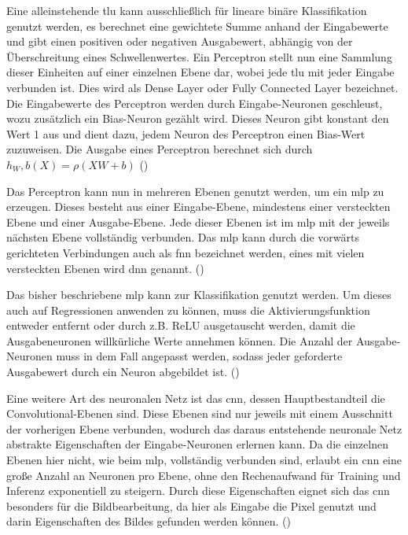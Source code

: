 Eine alleinstehende \ac{tlu} kann ausschließlich für lineare binäre Klassifikation genutzt werden, es berechnet eine gewichtete Summe anhand der Eingabewerte und gibt einen positiven oder negativen Ausgabewert, abhängig von der Überschreitung eines Schwellenwertes. Ein Perceptron stellt nun eine Sammlung dieser Einheiten auf einer einzelnen Ebene dar, wobei jede \ac{tlu} mit jeder Eingabe verbunden ist. Dies wird als Dense Layer oder Fully Connected Layer bezeichnet. Die Eingabewerte des Perceptron werden durch Eingabe-Neuronen geschleust, wozu zusätzlich ein Bias-Neuron gezählt wird. Dieses Neuron gibt konstant den Wert 1 aus und dient dazu, jedem Neuron des Perceptron einen Bias-Wert zuzuweisen. Die Ausgabe eines Perceptron berechnet sich durch \(h_W,b(X)=\rho(XW+b)\) (\cite[vgl. S. 284 ff.]{Geron2019})

Das Perceptron kann nun in mehreren Ebenen genutzt werden, um ein \ac{mlp} zu erzeugen. Dieses besteht aus einer Eingabe-Ebene, mindestens einer versteckten Ebene und einer Ausgabe-Ebene. Jede dieser Ebenen ist im \ac{mlp} mit der jeweils nächsten Ebene vollständig verbunden. Das \ac{mlp} kann durch die vorwärts gerichteten Verbindungen auch als \ac{fnn} bezeichnet werden, eines mit vielen versteckten Ebenen wird \ac{dnn} genannt. (\cite[vgl. S. 284 ff.]{Geron2019})

Das bisher beschriebene \ac{mlp} kann zur Klassifikation genutzt werden. Um dieses auch auf Regressionen anwenden zu können, muss die Aktivierungsfunktion entweder entfernt oder durch z.B. ReLU ausgetauscht werden, damit die Ausgabeneuronen willkürliche Werte annehmen können. Die Anzahl der Ausgabe-Neuronen muss in dem Fall angepasst werden, sodass jeder geforderte Ausgabewert durch ein Neuron abgebildet ist. (\cite[vgl. S. 292 ff.]{Geron2019})

Eine weitere Art des neuronalen Netz ist das \ac{cnn}, dessen Hauptbestandteil die Convolutional-Ebenen sind. Diese Ebenen sind nur jeweils mit einem Ausschnitt der vorherigen Ebene verbunden, wodurch das daraus entstehende neuronale Netz abstrakte Eigenschaften der Eingabe-Neuronen erlernen kann. Da die einzelnen Ebenen hier nicht, wie beim \ac{mlp}, vollständig verbunden sind, erlaubt ein \ac{cnn} eine große Anzahl an Neuronen pro Ebene, ohne den Rechenaufwand für Training und Inferenz exponentiell zu steigern. Durch diese Eigenschaften eignet sich das \ac{cnn} besonders für die Bildbearbeitung, da hier als Eingabe die Pixel genutzt und darin Eigenschaften des Bildes gefunden werden können. (\cite[vgl. S. 447 f.]{Geron2019})

